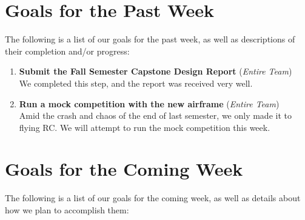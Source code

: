 \documentclass[]{../auvsi_doc}
\begin{document}
\section{Goals for the Past Week}

The following is a list of our goals for the past week, as well as descriptions of their completion and/or progress:

\begin{enumerate}
	\item \textbf{Submit the Fall Semester Capstone Design Report} (\textit{Entire Team}) \\
	We completed this step, and the report was received very well.
	\item \textbf{Run a mock competition with the new airframe} (\textit{Entire Team}) \\
	Amid the crash and chaos of the end of last semester, we only made it to flying RC. We will attempt to run the mock competition this week.
\end{enumerate}

\section{Goals for the Coming Week}

The following is a list of our goals for the coming week, as well as details about how we plan to accomplish them:
\end{document}
